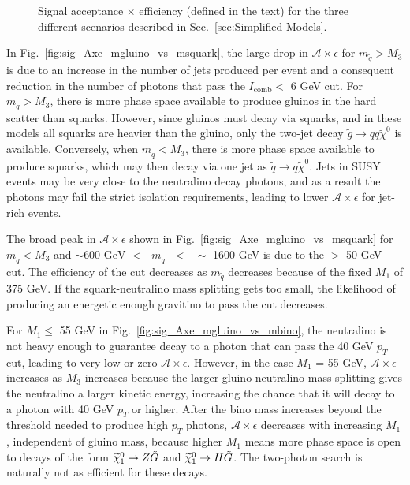 \documentclass[dissertation.tex]{subfiles}
\begin{document}
\begin{figure}
	\caption{Signal acceptance $\times$ efficiency (defined in the text) for the three different scenarios described in Sec.~\ref{sec:Simplified Models}.}
	\label{fig:sig_Axe}
\end{figure}

In Fig.~\ref{fig:sig_Axe_mgluino_vs_msquark}, the large drop in $\mathcal{A}\times\epsilon$ for $m_{\tilde{q}} > M_{3}$ is due to an increase in the number of jets produced per event and a consequent reduction in the number of photons that pass the $I_{\mathrm{comb}} <$ 6 GeV cut.  For $m_{\tilde{q}} > M_{3}$, there is more phase space available to produce gluinos in the hard scatter than squarks.  However, since gluinos must decay via squarks, and in these models all squarks are heavier than the gluino, only the two-jet decay $\tilde{g}\rightarrow qq\tilde{\chi}^{0}$ is available.  Conversely, when $m_{\tilde{q}} < M_{3}$, there is more phase space available to produce squarks, which may then decay via one jet as $\tilde{q}\rightarrow q\tilde{\chi}^{0}$.  Jets in SUSY events may be very close to the neutralino decay photons, and as a result the photons may fail the strict isolation requirements, leading to lower $\mathcal{A}\times\epsilon$ for jet-rich events.

The broad peak in $\mathcal{A}\times\epsilon$ shown in Fig.~\ref{fig:sig_Axe_mgluino_vs_msquark} for $m_{\tilde{q}} < M_{3}$ and $\sim600\mbox{ GeV }<\mbox{ }m_{\tilde{q}}\mbox{ }<\mbox{ }\sim$ 1600 GeV is due to the \MET $>$ 50 GeV cut.  The efficiency of the cut decreases as $m_{\tilde{q}}$ decreases because of the fixed $M_{1}$ of 375 GeV.  If the squark-neutralino mass splitting gets too small, the likelihood of producing an energetic enough gravitino to pass the \MET cut decreases.

For $M_{1} \leq$ 55 GeV in Fig.~\ref{fig:sig_Axe_mgluino_vs_mbino}, the neutralino is not heavy enough to guarantee decay to a photon that can pass the 40 GeV $p_{T}$ cut, leading to very low or zero $\mathcal{A}\times\epsilon$.  However, in the case $M_{1}$ = 55 GeV, $\mathcal{A}\times\epsilon$ increases as $M_{3}$ increases because the larger gluino-neutralino mass splitting gives the neutralino a larger kinetic energy, increasing the chance that it will decay to a photon with 40 GeV $p_{T}$ or higher.  After the bino mass increases beyond the threshold needed to produce high $p_{T}$ photons, $\mathcal{A}\times\epsilon$ decreases with increasing $M_{1}$, independent of gluino mass, because higher $M_{1}$ means more phase space is open to decays of the form $\widetilde{\chi}_{1}^{0}\rightarrow Z\tilde{G}$ and $\widetilde{\chi}_{1}^{0}\rightarrow H\tilde{G}$.  The two-photon search is naturally not as efficient for these decays.
\end{document}
